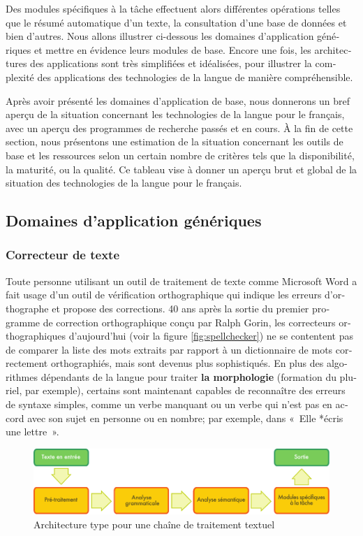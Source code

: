 \begin{french}
\begin{multicols}{2}
Des modules spécifiques à la tâche effectuent alors différentes
opérations telles que le résumé automatique d'un texte, la
consultation d'une base de données et bien d'autres. Nous allons
illustrer ci-dessous les domaines d'application génériques et mettre
en évidence leurs modules de base. Encore une fois, les architectures
des applications sont très simplifiées et idéalisées, pour illustrer
la complexité des applications des technologies de la langue de
manière compréhensible.

Après avoir présenté les domaines d'application de base, nous
donnerons un bref aperçu de la situation concernant les technologies
de la langue pour le français, avec un aperçu des programmes de
recherche passés et en cours. À la fin de cette section, nous
présentons une estimation de la situation concernant les outils de
base et les ressources selon un certain nombre de critères tels que la
disponibilité, la maturité, ou la qualité. Ce tableau vise à donner un
aperçu brut et global de la situation des technologies de la langue
pour le français.

\subsection{Domaines d'application génériques}
%
\subsubsection{Correcteur de texte}
%
Toute personne utilisant un outil de traitement de texte comme
Microsoft Word a fait usage d'un outil de vérification orthographique
qui indique les erreurs d'orthographe et propose des corrections.  40
ans après la sortie du premier programme de correction orthographique
conçu par Ralph Gorin, les correcteurs orthographiques d'aujourd'hui
(voir la figure \ref{fig:spellchecker}) ne se contentent pas de
comparer la liste des mots extraits par rapport à un dictionnaire de
mots correctement orthographiés, mais sont devenus plus
sophistiqués. En plus des algorithmes dépendants de la langue pour
traiter {\bf la morphologie} (formation du pluriel, par exemple),
certains sont maintenant capables de reconnaître des erreurs de
syntaxe simples, comme un verbe manquant ou un verbe qui n'est pas en
accord avec son sujet en personne ou en nombre; par exemple, dans
«~Elle *écris une lettre~».

\begin{figure}[t]
\begin{center}
 \includegraphics[width=\textwidth]{../_media/french/text_processing_app_architecture}
\caption{Architecture type pour une chaîne de traitement textuel}
\label{fig:textprocarchi}
\end{center}
\end{figure}


\end{multicols}
\end{french}
